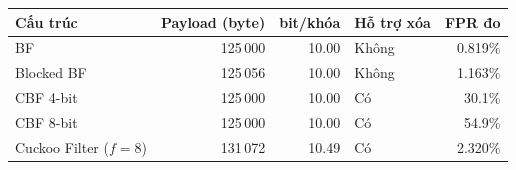 \begin{tabular}{@{}lrrlr@{}}
\toprule
Cấu trúc & Payload (byte) & bit/khóa & Hỗ trợ xóa & FPR đo\\
\midrule
BF & 125\,000 & 10.00 & Không & 0.819\%\\
Blocked BF & 125\,056 & 10.00 & Không & 1.163\%\\
CBF 4-bit & 125\,000 & 10.00 & Có & 30.1\%\\
CBF 8-bit & 125\,000 & 10.00 & Có & 54.9\%\\
Cuckoo Filter ($f=8$) & 131\,072 & 10.49 & Có & 2.320\%\\
\bottomrule
\end{tabular}
